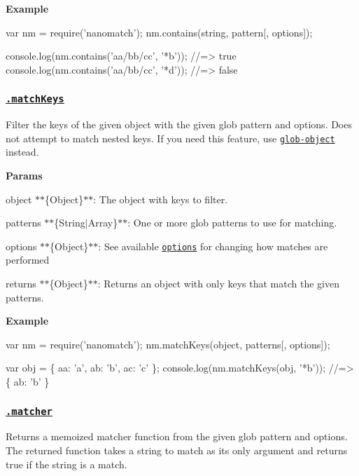 {\bfseries Example}


\begin{DoxyCode}
var nm = require('nanomatch');
nm.contains(string, pattern[, options]);

console.log(nm.contains('aa/bb/cc', '*b'));
//=> true
console.log(nm.contains('aa/bb/cc', '*d'));
//=> false
\end{DoxyCode}


\subsubsection*{\href{index.js#L450}{\tt .match\+Keys}}

Filter the keys of the given object with the given {\ttfamily glob} pattern and {\ttfamily options}. Does not attempt to match nested keys. If you need this feature, use \href{https://github.com/jonschlinkert/glob-object}{\tt glob-\/object} instead.

{\bfseries Params}


\begin{DoxyItemize}
\item {\ttfamily object} $\ast$$\ast$\{Object\}$\ast$$\ast$\+: The object with keys to filter.
\item {\ttfamily patterns} $\ast$$\ast$\{String$\vert$\+Array\}$\ast$$\ast$\+: One or more glob patterns to use for matching.
\item {\ttfamily options} $\ast$$\ast$\{Object\}$\ast$$\ast$\+: See available \href{#options}{\tt options} for changing how matches are performed
\item {\ttfamily returns} $\ast$$\ast$\{Object\}$\ast$$\ast$\+: Returns an object with only keys that match the given patterns.
\end{DoxyItemize}

{\bfseries Example}


\begin{DoxyCode}
var nm = require('nanomatch');
nm.matchKeys(object, patterns[, options]);

var obj = \{ aa: 'a', ab: 'b', ac: 'c' \};
console.log(nm.matchKeys(obj, '*b'));
//=> \{ ab: 'b' \}
\end{DoxyCode}


\subsubsection*{\href{index.js#L479}{\tt .matcher}}

Returns a memoized matcher function from the given glob {\ttfamily pattern} and {\ttfamily options}. The returned function takes a string to match as its only argument and returns true if the string is a match.

